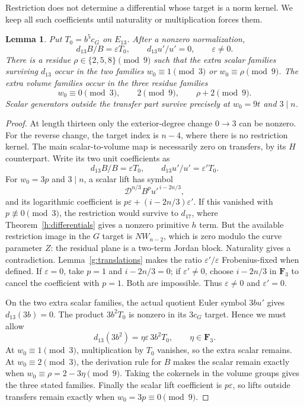 \documentclass[11pt]{article}
\newtheorem{lemma}[theorem]{Lemma}
\theoremstyle{definition}
\theoremstyle{remark}
\numberwithin{equation}{section}
\begin{document}
Restriction does not determine a differential whose target is a norm
kernel.  We keep all such coefficients until naturality or
multiplication forces them.

\begin{lemma}\label{g:d13}
Put $T_0=b^5c_G$ on $E_{13}$.  After a nonzero normalization,
\[
 d_{13}B/B=\varepsilon T_0,\qquad
 d_{13}u'/u'=0,\qquad \varepsilon\ne0.
\]
There is a residue $\rho\in\{2,5,8\}\pmod9$ such that the extra
scalar families surviving $d_{13}$ occur in the two families
$w_0\equiv1\pmod3$ or $w_0\equiv\rho\pmod9$.
The extra volume families occur in the three residue families
\[
 w_0\equiv0\pmod3,\qquad 2\pmod9,
 \qquad \rho+2\pmod9.
\]
Scalar generators outside the transfer part survive precisely at
$w_0=9t$ and $3\mid n$.
\end{lemma}

\begin{proof}
At length thirteen only the exterior-degree change $0\to3$ can
be nonzero.  For the reverse change, the target index is $n-4$,
where there is no restriction kernel.  The main scalar-to-volume
map is necessarily zero on transfers, by its $H$ counterpart.
Write its two unit coefficients as
\[
 d_{13}B/B=\varepsilon T_0,\qquad
 d_{13}u'/u'=\varepsilon'T_0.
\]
For $w_0=3p$ and $3\mid n$, a scalar lift has symbol
\[
 \mathcal D^{n/3}B^pu'^{\,i-2n/3},
\]
and its logarithmic coefficient is
$p\varepsilon+(i-2n/3)\varepsilon'$.  If this vanished with
$p\not\equiv0\pmod3$, the restriction would survive to
$d_{17}$, where Theorem~\ref{h:differentials} gives a nonzero
primitive $h$ term.  But the available restriction image in the
$G$ target is $NW_{n-2}$, which is zero modulo the curve
parameter $Z$: the residual plane is a two-term Jordan block.
Naturality gives a contradiction.  Lemma~\ref{g:translations}
makes the ratio $\varepsilon'/\varepsilon$ Frobenius-fixed when
defined.  If $\varepsilon=0$, take $p=1$ and $i-2n/3=0$;
if $\varepsilon'\ne0$, choose $i-2n/3$ in $\mathbf F_3$ to cancel
the coefficient with $p=1$.  Both are impossible.  Thus
$\varepsilon\ne0$ and $\varepsilon'=0$.

On the two extra scalar families, the actual quotient Euler
symbol $3bu'$ gives $d_{13}(3b)=0$.  The product
$3b^2T_0$ is nonzero in its $3c_G$ target.  Hence we must
allow
\[
 d_{13}(3b^2)=\eta\varepsilon\,3b^2T_0,
 \qquad \eta\in\mathbf F_3.
\]
At $w_0\equiv1\pmod3$, multiplication by $T_0$ vanishes,
so the extra scalar remains.  At $w_0\equiv2\pmod3$,
the derivation rule for $B$ makes the scalar remain exactly
when $w_0\equiv\rho=2-3\eta\pmod9$.  Taking the
cokernels in the volume groups gives the three stated
families.  Finally the scalar lift coefficient is
$p\varepsilon$, so lifts outside transfers remain exactly
when $w_0=3p\equiv0\pmod9$.
\end{proof}
\end{document}
